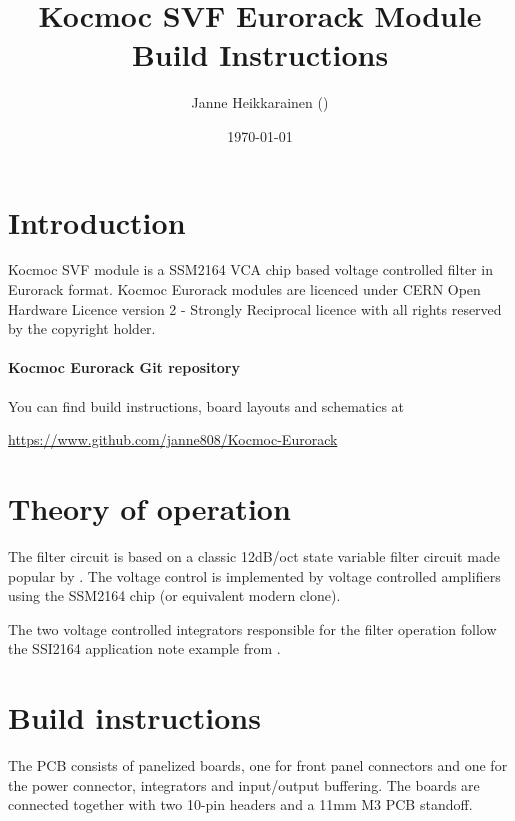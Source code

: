 \documentclass{article}
\title{Kocmoc SVF Eurorack Module Build Instructions}
\author{Janne Heikkarainen (\email{janne808@radiofreerobotron.net}) \\
	}
\date{\today}
\begin{document}
\maketitle

\section{Introduction}
Kocmoc SVF module is a SSM2164 VCA chip based voltage controlled filter in Eurorack format. Kocmoc Eurorack modules are licenced under CERN Open Hardware Licence version 2 - Strongly Reciprocal licence with all rights reserved by the copyright holder. \newline

\paragraph{Kocmoc Eurorack Git repository}
\begin{flushleft}
You can find build instructions, board layouts and schematics at \newline
\end{flushleft}
\begin{center}
\href{https://www.github.com/janne808/Kocmoc-Eurorack}{https://www.github.com/janne808/Kocmoc-Eurorack}
\end{center}

\section{Theory of operation} \label{theoryofoperation}

The filter circuit is based on a classic 12dB/oct state variable filter circuit made popular by \cite{chamberlin}. The voltage control is implemented by voltage controlled amplifiers using the SSM2164 chip (or equivalent modern clone).\newline

The two voltage controlled integrators responsible for the filter operation follow the SSI2164 application note example from \cite{allaert}.

\section{Build instructions} \label{buildinstructions}

The PCB consists of panelized boards, one for front panel connectors and one for the power connector, integrators and input/output buffering. The boards are connected together with two 10-pin headers and a 11mm M3 PCB standoff.\newline
\end{document}
